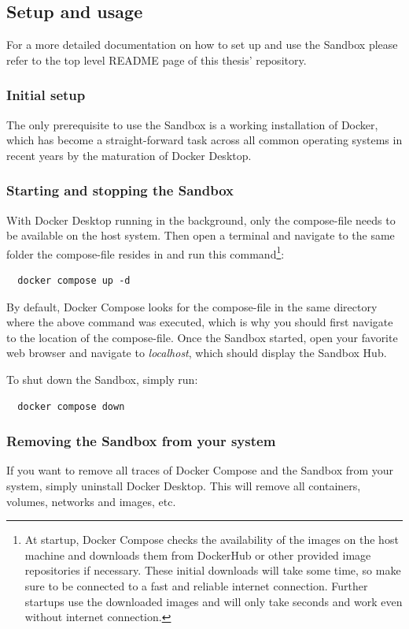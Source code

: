 \documentclass[11pt, a4paper, oneside, parskip=full-]{scrartcl}
\begin{document}
\subsection{Setup and usage}
For a more detailed documentation on how to set up and use the Sandbox please
refer to the top level README page of this thesis'
repository\cite{osgeostacksandbox}.

\subsubsection*{Initial setup}
The only prerequisite to use the Sandbox is a working installation of Docker,
which has become a straight-forward task across all common operating systems in
recent years by the maturation of Docker Desktop\cite{dockerdesktop}.

\subsubsection*{Starting and stopping the Sandbox}
With Docker Desktop running in the background, only the
compose-file\cite{sandboxcomposefile} needs to be available on the host system.
Then open a terminal and navigate to the same folder the compose-file resides in
and run this command\footnote{At startup, Docker Compose checks the availability
of the images on the host machine and downloads them from DockerHub or other
provided image repositories if necessary. These initial downloads will take some
time, so make sure to be connected to a fast and reliable internet connection.
Further startups use the downloaded images and will only take seconds and work
even without internet connection.}:
\begin{lstlisting}
  docker compose up -d
\end{lstlisting}

By default, Docker Compose looks for the compose-file in the same directory
where the above command was executed, which is why you should first navigate to
the location of the compose-file. Once the Sandbox started, open your favorite
web browser and navigate to \emph{localhost}, which should display the Sandbox
Hub.

To shut down the Sandbox, simply run:
\begin{lstlisting}
  docker compose down
\end{lstlisting}

\subsubsection*{Removing the Sandbox from your system}
If you want to remove all traces of Docker Compose and the Sandbox from your
system, simply uninstall Docker Desktop. This will remove all containers,
volumes, networks and images, etc.
\end{document}
